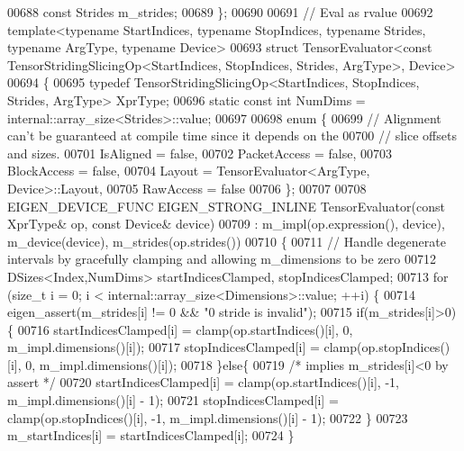 \begin{DoxyCode}
00688     \textcolor{keyword}{const} Strides m\_strides;
00689 \};
00690 
00691 \textcolor{comment}{// Eval as rvalue}
00692 \textcolor{keyword}{template}<\textcolor{keyword}{typename} StartIndices, \textcolor{keyword}{typename} StopIndices, \textcolor{keyword}{typename} Str\textcolor{keywordtype}{id}es, \textcolor{keyword}{typename} ArgType, \textcolor{keyword}{typename} Device>
00693 \textcolor{keyword}{struct }TensorEvaluator<const TensorStridingSlicingOp<StartIndices, StopIndices, Strides, ArgType>, Device>
00694 \{
00695   \textcolor{keyword}{typedef} TensorStridingSlicingOp<StartIndices, StopIndices, Strides, ArgType> XprType;
00696   \textcolor{keyword}{static} \textcolor{keyword}{const} \textcolor{keywordtype}{int} NumDims = internal::array\_size<Strides>::value;
00697 
00698   \textcolor{keyword}{enum} \{
00699     \textcolor{comment}{// Alignment can't be guaranteed at compile time since it depends on the}
00700     \textcolor{comment}{// slice offsets and sizes.}
00701     IsAligned = \textcolor{keyword}{false},
00702     PacketAccess = \textcolor{keyword}{false},
00703     BlockAccess = \textcolor{keyword}{false},
00704     Layout = TensorEvaluator<ArgType, Device>::Layout,
00705     RawAccess = \textcolor{keyword}{false}
00706   \};
00707 
00708   EIGEN\_DEVICE\_FUNC EIGEN\_STRONG\_INLINE TensorEvaluator(\textcolor{keyword}{const} XprType& op, \textcolor{keyword}{const} Device& device)
00709       : m\_impl(op.expression(), device), m\_device(device), m\_strides(op.strides())
00710   \{
00711     \textcolor{comment}{// Handle degenerate intervals by gracefully clamping and allowing m\_dimensions to be zero}
00712     DSizes<Index,NumDims> startIndicesClamped, stopIndicesClamped;
00713     \textcolor{keywordflow}{for} (\textcolor{keywordtype}{size\_t} i = 0; i < internal::array\_size<Dimensions>::value; ++i) \{
00714       eigen\_assert(m\_strides[i] != 0 && \textcolor{stringliteral}{"0 stride is invalid"});
00715       \textcolor{keywordflow}{if}(m\_strides[i]>0)\{
00716         startIndicesClamped[i] = clamp(op.startIndices()[i], 0, m\_impl.dimensions()[i]);
00717         stopIndicesClamped[i] = clamp(op.stopIndices()[i], 0, m\_impl.dimensions()[i]);
00718       \}\textcolor{keywordflow}{else}\{
00719         \textcolor{comment}{/* implies m\_strides[i]<0 by assert */}
00720         startIndicesClamped[i] = clamp(op.startIndices()[i], -1, m\_impl.dimensions()[i] - 1);
00721         stopIndicesClamped[i] = clamp(op.stopIndices()[i], -1, m\_impl.dimensions()[i] - 1);
00722       \}
00723       m\_startIndices[i] = startIndicesClamped[i];
00724     \}

\end{DoxyCode}
